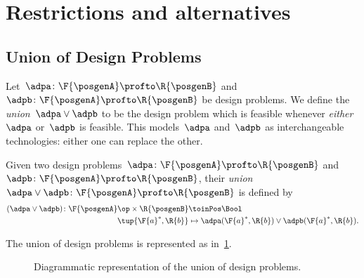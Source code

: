 

\section{Restrictions and alternatives}

\subsection{Union of Design Problems}
Let~$\adpa\colon \F{\posgenA}\profto \R{\posgenB}$ and~$\adpb\colon \F{\posgenA}\profto \R{\posgenB}$ be design problems.
We define the \emph{union}~$\adpa \vee \adpb$ to be the design problem which is feasible whenever \emph{either}~$\adpa$ or~$\adpb$ is feasible.
This models~$\adpa$ and~$\adpb$ as interchangeable technologies: either one can replace the other.

\begin{definition}
  \label{def:union_dp}
  Given two design problems~$\adpa \colon \F{\posgenA} \profto \R{\posgenB}$ and~$\adpb\colon \F{\posgenA} \profto \R{\posgenB}$, their \emph{union}~$\adpa \vee \adpb\colon \F{\posgenA} \profto \R{\posgenB}$ is defined by
  \begin{equation}
    \begin{aligned}
    (\adpa \vee \adpb)
      \colon \F{\posgenA}\op \times \R{\posgenB} & \toinPos \Bool \\
      \tup{\F{a}^*, \R{b}} & \mapsto \adpa(\F{a}^*, \R{b}) \vee \adpb(\F{a}^*, \R{b}).
    \end{aligned}
  \end{equation}
\end{definition}

The union of design problems is represented as in~\cref{fig:uniondp}.

\begin{figure}[h!]
  \begin{center}
  \end{center}
  \caption{Diagrammatic representation of the union of design problems. }
  \label{fig:uniondp}
\end{figure}

